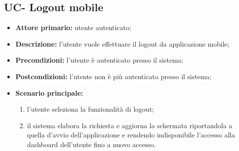 \subsection{UC- Logout mobile}
\begin{itemize}
	\item \textbf{Attore primario:} utente autenticato;

	\item \textbf{Descrizione:} l'utente vuole effettuare il logout da applicazione mobile;

	\item \textbf{Precondizioni:} l'utente è autenticato presso il sistema;

	\item \textbf{Postcondizioni:} l'utente non è più autenticato presso il sistema;

	\item \textbf{Scenario principale:}

	      \begin{enumerate}
		      \item l'utente seleziona la funzionalità di logout;
		      \item il sistema elabora la richiesta e aggiorna la schermata riportandola a quella d'avvio dell'applicazione e rendendo indisponibile l'accesso alla dashboard dell'utente fino a nuovo accesso.
	      \end{enumerate}
\end{itemize}